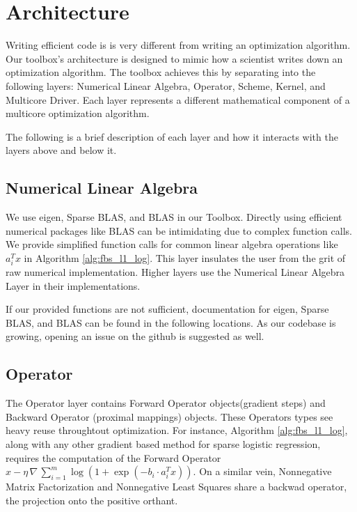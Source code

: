 \section{Architecture}

Writing efficient code is is very different from writing an optimization algorithm.
Our toolbox's architecture is designed to mimic how a scientist writes down an optimization algorithm.
The toolbox achieves this by separating into the following layers: Numerical Linear Algebra, Operator, Scheme, Kernel, and Multicore Driver.
Each layer represents a different mathematical component of a multicore optimization algorithm. 

The following is a brief description of each layer and how it interacts with the layers above and below it.

\subsection{Numerical Linear Algebra}

We use eigen, Sparse BLAS, and BLAS in our Toolbox.
Directly using efficient numerical packages like BLAS can be intimidating due to complex function calls. We provide simplified function calls for common linear algebra operations like $a_i^T x$ in Algorithm \ref{alg:fbs_l1_log}. This layer insulates the user from the grit of raw numerical implementation. Higher layers use the Numerical Linear Algebra Layer in their implementations.

If our provided functions are not sufficient, documentation for eigen, Sparse BLAS, and BLAS can be found in the following locations. As our codebase is growing, opening an issue on the github is suggested as well.

\subsection{Operator}

The Operator layer contains Forward Operator objects(gradient steps) and Backward Operator (proximal mappings) objects. These Operators types see heavy reuse throughtout optimization.
For instance, Algorithm \ref{alg:fbs_l1_log}, along with any other gradient based method for sparse logistic regression, requires the computation of the Forward Operator $x - \eta \, \nabla \,\sum_{i = 1}^m \log (1 + \exp(-b_i \cdot a_i^T x))$. On a similar vein, Nonnegative Matrix Factorization and Nonnegative Least Squares share a backwad operator, the projection onto the positive orthant.

